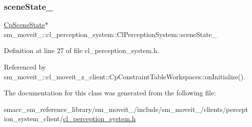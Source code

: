 \subsubsection{\texorpdfstring{scene\+State\+\_\+}{sceneState\_}}
{\footnotesize\ttfamily \hyperlink{classsm__moveit__4_1_1cl__perception__system_1_1CpSceneState}{Cp\+Scene\+State}$\ast$ sm\+\_\+moveit\+\_\+::cl\+\_\+perception\+\_\+system\+::\+Cl\+Perception\+System\+::scene\+State\+\_\+}



Definition at line 27 of file cl\+\_\+perception\+\_\+system.\+h.



Referenced by sm\+\_\+moveit\+\_\+::cl\+\_\+moveit\+\_\+z\+\_\+client\+::\+Cp\+Constraint\+Table\+Workspaces\+::on\+Initialize().



The documentation for this class was generated from the following file\+:\begin{DoxyCompactItemize}
\item 
smacc\+\_\+sm\+\_\+reference\+\_\+library/sm\+\_\+moveit\+\_/include/sm\+\_\+moveit\+\_/clients/perception\+\_\+system\+\_\+client/\hyperlink{4_2include_2sm__moveit__4_2clients_2perception__system__client_2cl__perception__system_8h}{cl\+\_\+perception\+\_\+system.\+h}\end{DoxyCompactItemize}
